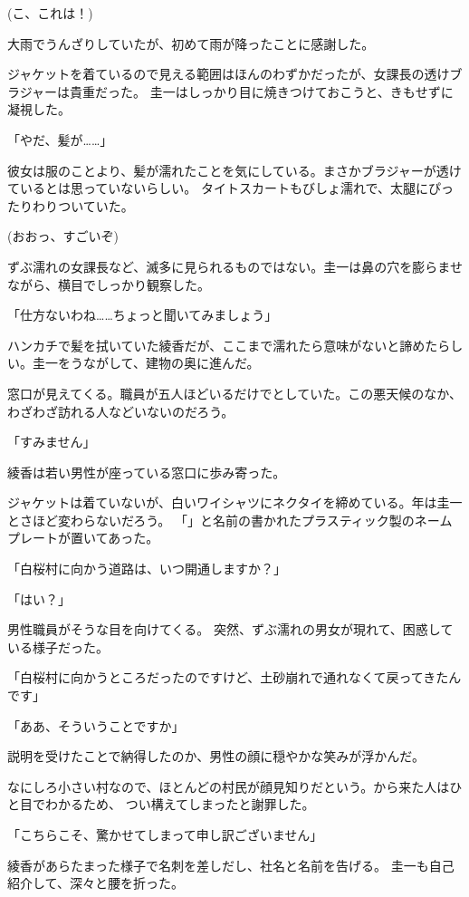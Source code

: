 ﻿\documentclass[
    book,tate,
    line_length=30zw,
    jafontsize=12pt,
    paper=b5j,
    landscape,
    ]{jlreq}
\begin{document}
(こ、これは！)

大雨でうんざりしていたが、初めて雨が降ったことに感謝した。

ジャケットを着ているので見える範囲はほんのわずかだったが、女課長の透けブラジャーは貴重だった。
圭一はしっかり目に焼きつけておこうと、きもせずに凝視した。

「やだ、髪が……」

彼女は服のことより、髪が濡れたことを気にしている。まさかブラジャーが透けているとは思っていないらしい。
タイトスカートもびしょ濡れで、太腿にぴったりわりついていた。

(おおっ、すごいぞ)

ずぶ濡れの女課長など、滅多に見られるものではない。圭一は鼻の穴を膨らませながら、横目でしっかり観察した。

「仕方ないわね……ちょっと聞いてみましょう」

ハンカチで髪を拭いていた綾香だが、ここまで濡れたら意味がないと諦めたらしい。圭一をうながして、建物の奥に進んだ。

窓口が見えてくる。職員が五人ほどいるだけでとしていた。この悪天候のなか、
わざわざ訪れる人などいないのだろう。

「すみません」

綾香は若い男性が座っている窓口に歩み寄った。

ジャケットは着ていないが、白いワイシャツにネクタイを締めている。年は圭一とさほど変わらないだろう。
「」と名前の書かれたプラスティック製のネームプレートが置いてあった。

「白桜村に向かう道路は、いつ開通しますか？」

「はい？」

男性職員がそうな目を向けてくる。 突然、ずぶ濡れの男女が現れて、困惑している様子だった。

「白桜村に向かうところだったのですけど、土砂崩れで通れなくて戻ってきたんです」

「ああ、そういうことですか」

説明を受けたことで納得したのか、男性の顔に穏やかな笑みが浮かんだ。

なにしろ小さい村なので、ほとんどの村民が顔見知りだという。から来た人はひと目でわかるため、
つい構えてしまったと謝罪した。

「こちらこそ、驚かせてしまって申し訳ございません」

綾香があらたまった様子で名刺を差しだし、社名と名前を告げる。 圭一も自己紹介して、深々と腰を折った。
\end{document}
